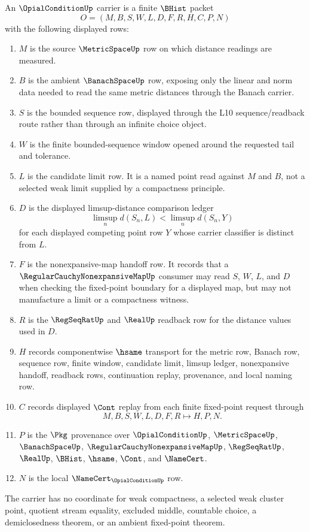 \begin{definition}
\label{def:opial-condition-carrier}
An $\OpialConditionUp$ carrier is a finite $\BHist$ packet
$$
O=(M,B,S,W,L,D,F,R,H,C,P,N)
$$
with the following displayed rows:
\begin{enumerate}
\item $M$ is the source $\MetricSpaceUp$ row on which distance readings are measured.
\item $B$ is the ambient $\BanachSpaceUp$ row, exposing only the linear and norm data needed to read the same metric distances through the Banach carrier.
\item $S$ is the bounded sequence row, displayed through the L10 sequence/readback route rather than through an infinite choice object.
\item $W$ is the finite bounded-sequence window opened around the requested tail and tolerance.
\item $L$ is the candidate limit row. It is a named point read against $M$ and $B$, not a selected weak limit supplied by a compactness principle.
\item $D$ is the displayed limsup-distance comparison ledger
$$
\limsup_n d(S_n,L) < \limsup_n d(S_n,Y)
$$
for each displayed competing point row $Y$ whose carrier classifier is distinct from $L$.
\item $F$ is the nonexpansive-map handoff row. It records that a $\RegularCauchyNonexpansiveMapUp$ consumer may read $S$, $W$, $L$, and $D$ when checking the fixed-point boundary for a displayed map, but may not manufacture a limit or a compactness witness.
\item $R$ is the $\RegSeqRatUp$ and $\RealUp$ readback row for the distance values used in $D$.
\item $H$ records componentwise $\hsame$ transport for the metric row, Banach row, sequence row, finite window, candidate limit, limsup ledger, nonexpansive handoff, readback rows, continuation replay, provenance, and local naming row.
\item $C$ records displayed $\Cont$ replay from each finite fixed-point request through
$$
M,B,S,W,L,D,F,R \longmapsto H,P,N .
$$
\item $P$ is the $\Pkg$ provenance over $\OpialConditionUp$, $\MetricSpaceUp$, $\BanachSpaceUp$, $\RegularCauchyNonexpansiveMapUp$, $\RegSeqRatUp$, $\RealUp$, $\BHist$, $\hsame$, $\Cont$, and $\NameCert$.
\item $N$ is the local $\NameCert_{\OpialConditionUp}$ row.
\end{enumerate}
The carrier has no coordinate for weak compactness, a selected weak cluster point, quotient stream equality, excluded middle, countable choice, a demiclosedness theorem, or an ambient fixed-point theorem.
\end{definition}


